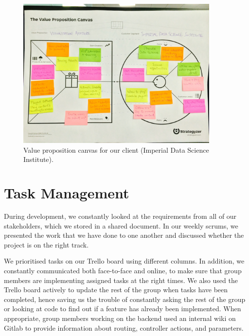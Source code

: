 \documentclass[a4paper]{article}
\begin{document}
\begin{figure}[H]
   \begin{center}
      \includegraphics[width = 0.9\textwidth, trim = 1cm 6.5cm 1cm 4.5cm, clip]{./evaluation/value_prop_canvas.jpg}
   \end{center}
   \caption{Value proposition canvas for our client (Imperial Data Science Institute).}
   \label{fig:valpropcanvas}
\end{figure}

\section{Task Management}

During development, we constantly looked at the requirements from all of our stakeholders, which we stored in a shared document. In our weekly scrums, we presented the work that we have done to one another and discussed whether the project is on the right track.

We prioritised tasks on our Trello board using different columns. In addition, we constantly communicated both face-to-face and online, to make sure that group members are implementing assigned tasks at the right times. We also used the Trello board actively to update the rest of the group when tasks have been completed, hence saving us the trouble of constantly asking the rest of the group or looking at code to find out if a feature has already been implemented. When appropriate, group members working on the backend used an internal wiki on Gitlab to provide information about routing, controller actions, and parameters. 
\end{document}
